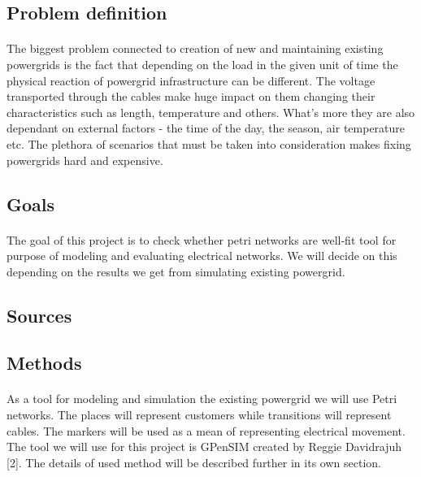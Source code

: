 \documentclass[a4paper]{article}
\begin{document}
\subsection{Problem definition}

\paragraph{}
The biggest problem connected to creation of new and maintaining existing powergrids is the fact that depending on the load in the given unit of time the physical reaction of powergrid infrastructure can be different. The voltage transported through the cables make huge impact on them changing their characteristics such as length, temperature and others. What's more they are also dependant on external factors - the time of the day, the season, air temperature etc. The plethora of scenarios that must be taken into consideration makes fixing powergrids hard and expensive.

\subsection{Goals}                                                                          
\paragraph{}
The goal of this project is to check whether petri networks are well-fit tool for purpose of modeling and evaluating electrical networks. We will decide on this depending on the results we get from simulating existing powergrid. 

\subsection{Sources}

\paragraph{}

\subsection{Methods}

\paragraph{}
As a tool for modeling and simulation the existing powergrid we will use Petri networks. The places will represent customers while transitions will represent cables. The markers will be used as a mean of representing electrical movement. The tool we will use for this project is GPenSIM created by Reggie Davidrajuh [2]. The details of used method will be described further in its own section.
\end{document}
